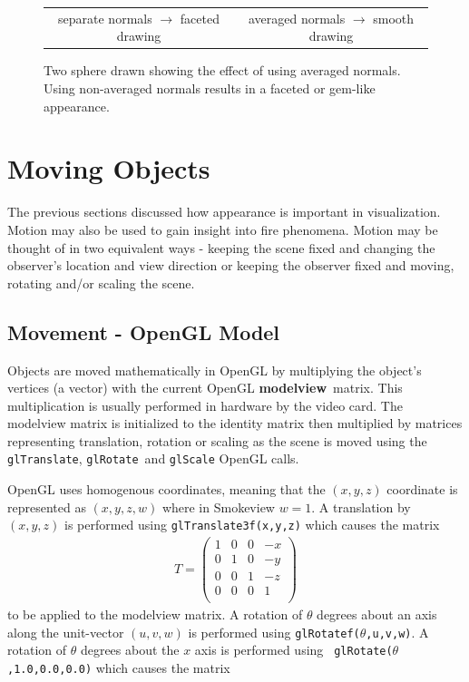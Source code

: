 \documentclass[11pt,twoside]{book}
\begin{document}
\begin{figure}[t]
\begin{center}
\begin{tabular}{cc}
separate normals $\rightarrow$ faceted drawing&averaged normals $\rightarrow$ smooth drawing\\
\end{tabular}
\end{center}
\caption {Two sphere drawn showing the effect of using averaged
normals.  Using non-averaged normals results in a faceted or
gem-like appearance. } \label{fignormals}
\end{figure}






\chapter{Moving Objects} The previous sections discussed how appearance
is important in visualization.  Motion may also be used to gain insight
into fire phenomena.
Motion may be thought of in two equivalent ways - keeping the
scene fixed and changing the observer's location and view
direction or keeping the observer fixed and moving, rotating
and/or scaling the scene.

\section{Movement - OpenGL Model}
Objects are moved mathematically in OpenGL by multiplying the
object's vertices (a vector) with the current OpenGL {\bf
modelview}\ matrix.  This multiplication is usually performed in
hardware by the video card.  The modelview matrix is initialized
to the identity matrix then multiplied by matrices representing
translation, rotation or scaling as the scene is moved using
the {\tt glTranslate}, {\tt glRotate}\ and {\tt glScale} OpenGL
calls.

OpenGL uses homogenous coordinates, meaning that
the $(x,y,z)$ coordinate is represented as $(x,y,z,w)$ where in
Smokeview $w=1$.  A translation by $(x,y,z)$ is performed using
{\tt glTranslate3f(x,y,z)} which causes the matrix
\begin{eqnarray*}
T=\left(%
\begin{array}{cccc}
  1 & 0 & 0 & -x \\
  0 & 1 & 0 & -y \\
  0 & 0 & 1 & -z \\
  0 & 0 & 0 & 1 \\
\end{array}%
\right)
\end{eqnarray*}
to be applied to the modelview matrix.  A rotation of $\theta$
degrees about an axis along the unit-vector $(u,v,w)$ is performed
using {\tt glRotatef($\theta$,u,v,w)}.  A rotation of $\theta$
degrees about the $x$ axis is performed using {\tt
glRotate($\theta$,1.0,0.0,0.0)} which causes the matrix
\end{document}
